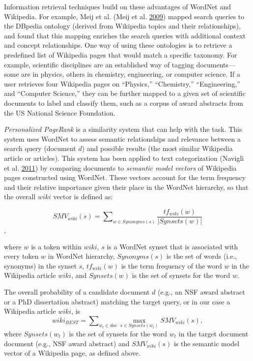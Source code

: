 \documentclass[]{krantz}
\begin{document}
Information retrieval techniques build on these advantages of WordNet
and Wikipedia. For example, Meij et al. (Meij et al.
\protect\hyperlink{ref-meij-09}{2009}) mapped search queries to the
DBpedia ontology (derived from Wikipedia topics and their
relationships), and found that this mapping enriches the search queries
with additional context and concept relationships. One way of using
these ontologies is to retrieve a predefined list of Wikipedia pages
that would match a specific taxonomy. For example, scientific
disciplines are an established way of tagging documents--- some are in
physics, others in chemistry, engineering, or computer science. If a
user retrieves four Wikipedia pages on ``Physics,'' ``Chemistry,''
``Engineering,'' and ``Computer Science,'' they can be further mapped to
a given set of scientific documents to label and classify them, such as
a corpus of award abstracts from the US National Science Foundation.

\emph{Personalized PageRank} is a similarity system that can help with
the task. This system uses WordNet to assess semantic relationships and
relevance between a search query (document \(d\)) and possible results
(the most similar Wikipedia article or articles). This system has been
applied to text categorization (Navigli et al.
\protect\hyperlink{ref-navigli-11}{2011}) by comparing documents to
\emph{semantic model vectors} of Wikipedia pages constructed using
WordNet. These vectors account for the term frequency and their relative
importance given their place in the WordNet hierarchy, so that the
overall \(wiki\) vector is defined as:

\[SMV_{wiki}(s) = \sum\nolimits_{w\in Synonyms(s)} \frac{tf_{wiki}(w)}{|Synsets(w)|}\],

where \(w\) is a token within \(wiki\), \(s\) is a WordNet synset that
is associated with every token \(w\) in WordNet hierarchy,
\(Synonyms(s)\) is the set of words (i.e., synonyms) in the synset
\(s\), \(tf_{wiki}(w)\) is the term frequency of the word \(w\) in the
Wikipedia article \(wiki\), and \(Synsets(w)\) is the set of synsets for
the word \(w\).

The overall probability of a candidate document \(d\) (e.g., an NSF
award abstract or a PhD dissertation abstract) matching the target
query, or in our case a Wikipedia article \(wiki\), is
\[wiki_{BEST}=\sum\nolimits_{w_t\in doc} \max_{s\in Synsets(w_t)} SMV_{wiki}(s),\]
where \(Synsets(w_t)\) is the set of synsets for the word \(w_t\) in the
target document document (e.g., NSF award abstract) and
\(SMV_{wiki}(s)\) is the semantic model vector of a Wikipedia page, as
defined above.
\end{document}
